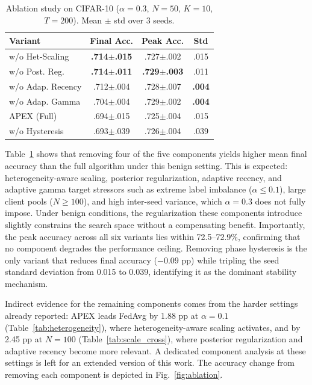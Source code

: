 \documentclass[journal]{IEEEtran}
\begin{document}
\begin{table}[t]
\centering
\caption{Ablation study on CIFAR-10 ($\alpha = 0.3$, $N = 50$, $K = 10$, $T = 200$). Mean $\pm$ std over 3 seeds.}
\label{tab:ablation}
\footnotesize
\renewcommand{\arraystretch}{1.0}
\setlength{\tabcolsep}{2.5pt}
\begin{tabular}{lccc}
\toprule
\textbf{Variant} & \textbf{Final Acc.} & \textbf{Peak Acc.} & \textbf{Std} \\
\midrule
w/o Het-Scaling & \textbf{.714$\pm$.015} & .727$\pm$.002 & .015 \\
w/o Post. Reg. & \textbf{.714$\pm$.011} & \textbf{.729$\pm$.003} & .011 \\
w/o Adap. Recency & .712$\pm$.004 & .728$\pm$.007 & \textbf{.004} \\
w/o Adap. Gamma & .704$\pm$.004 & .729$\pm$.002 & \textbf{.004} \\
APEX (Full) & .694$\pm$.015 & .725$\pm$.004 & .015 \\
w/o Hysteresis & .693$\pm$.039 & .726$\pm$.004 & .039 \\
\bottomrule
\end{tabular}
\end{table}

Table~\ref{tab:ablation} shows that removing four of the five components yields higher mean final accuracy than the full algorithm under this benign setting. This is expected: heterogeneity-aware scaling, posterior regularization, adaptive recency, and adaptive gamma target stressors such as extreme label imbalance ($\alpha \leq 0.1$), large client pools ($N \geq 100$), and high inter-seed variance, which $\alpha = 0.3$ does not fully impose. Under benign conditions, the regularization these components introduce slightly constrains the search space without a compensating benefit. Importantly, the peak accuracy across all six variants lies within 72.5--72.9\%, confirming that no component degrades the performance ceiling. Removing phase hysteresis is the only variant that reduces final accuracy ($-0.09$ pp) while tripling the seed standard deviation from 0.015 to 0.039, identifying it as the dominant stability mechanism.

Indirect evidence for the remaining components comes from the harder settings already reported: APEX leads FedAvg by 1.88 pp at $\alpha = 0.1$ (Table~\ref{tab:heterogeneity}), where heterogeneity-aware scaling activates, and by 2.45 pp at $N = 100$ (Table~\ref{tab:scale_cross}), where posterior regularization and adaptive recency become more relevant. A dedicated component analysis at these settings is left for an extended version of this work. The accuracy change from removing each component is depicted in Fig.~\ref{fig:ablation}.
\end{document}
